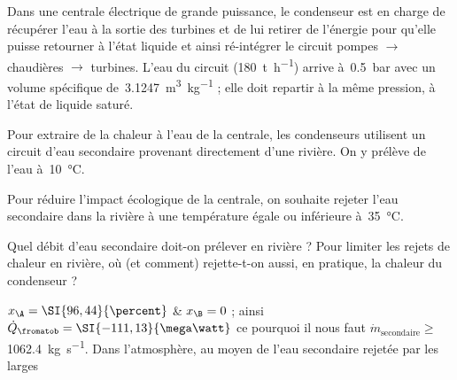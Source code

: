 \begin{Exercise}[title=Condensateur de centrale à vapeur]
  Dans une centrale électrique de grande puissance, le condenseur est en charge
  de récupérer l’eau à la sortie des turbines et de lui retirer de l’énergie
  pour qu’elle puisse retourner à l’état liquide et ainsi ré-intégrer le circuit
  pompes $\to$ chaudières $\to$ turbines. L’eau du circuit
  (\SI{180}{\tonne\per\hour}) arrive à~\SI{0,5}{\bar} avec un volume spécifique
  de~\SI{3,1247}{\metre\cubed\per\kilogram} ; elle doit repartir à la même
  pression, à l’état de liquide saturé.

	Pour extraire de la chaleur à l’eau de la centrale, les condenseurs
    utilisent un circuit d’eau secondaire provenant directement d’une rivière.
    On y prélève de l’eau à~\SI{10}{\degreeCelsius}.

	Pour réduire l’impact écologique de la centrale, on souhaite rejeter l’eau
    secondaire dans la rivière à une température égale ou inférieure
    à~\SI{35}{\degreeCelsius}.

    \Question Quel débit d’eau secondaire doit-on prélever en rivière ?
    \Question Pour limiter les rejets de chaleur en rivière, où (et comment)
    rejette-t-on aussi, en pratique, la chaleur du condenseur ?

\end{Exercise}
\begin{Answer}
  \Question  $x_\A = \SI{96,44}{\percent}$ \& $x_\B = 0$ ; ainsi $\dot
  Q_\fromatob = \SI{-111,13}{\mega\watt}$ ce pourquoi il nous faut
  $\dot{m}_{\text{secondaire}}\ge$\SI{1062,4}{\kg\per\s}.
  \Question  Dans l’atmosphère, au moyen de l’eau secondaire rejetée par les larges

\end{Answer}

